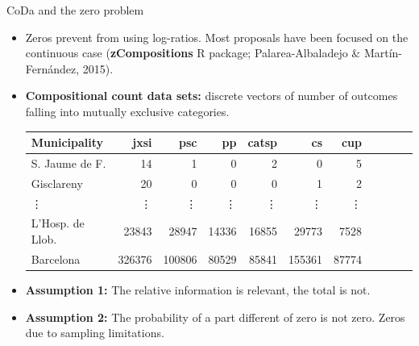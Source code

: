 \documentclass[9pt]{beamer}
\begin{document}
\begin{frame}{CoDa and the zero problem}

\begin{itemize}
\item Zeros prevent from using log-ratios. Most proposals have been focused on the continuous case (\textbf{zCompositions} R package; Palarea-Albaladejo \& Martín-Fernández, 2015).
\item
  \textbf{Compositional count data sets:} discrete vectors of number of outcomes falling into mutually exclusive categories.
\begin{table}[ht]
\centering
\scriptsize
\begin{tabular}{lrrrrrrrrrr}
  \hline
\textbf{Municipality} & \textbf{jxsi} & \textbf{psc} & \textbf{pp} & \textbf{catsp} & \textbf{cs} & \textbf{cup}  \\ 
  \hline
   S. Jaume de F. &  14 &   1 &   {\color{red}0} &   2 &   {\color{red}0} &   5  \\ 
  Gisclareny &  20 &   {\color{red}0} &   {\color{red}0} &   {\color{red}0} &   1 &   2  \\ 
\vdots &  \vdots &  \vdots & \vdots & \vdots  &  \vdots & \vdots  \\
L'Hosp. de Llob. & 23843 & 28947 & 14336 & 16855 & 29773 & 7528\\
Barcelona & 326376 & 100806 & 80529 & 85841 & 155361 & 87774 \\
\end{tabular}
\end{table}
\item \textbf{Assumption 1:} The relative information is relevant, the total is not.  
\item \textbf{Assumption 2:} The probability of a part different of zero is not zero. Zeros due to sampling limitations.

\end{itemize}

\end{frame}
\end{document}
